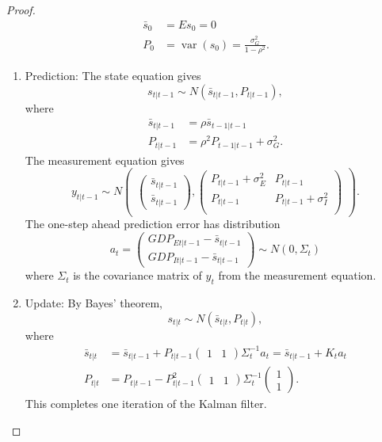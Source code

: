 \documentclass[oneside,reqno]{amsart}
\DeclareMathOperator{\var}{var}
\theoremstyle{definition}
\begin{document}
\begin{enumerate}[label=(\roman*)]
\begin{proof}
\begin{align*}
	\bar s_0 &= E s_0 = 0 \\
	P_0 &= \var(s_0) = \frac{\sigma^2_{G}}{1-\rho^2}.
\end{align*}
\begin{enumerate}[label=(\arabic*)]
\item
Prediction: The state equation gives
\[
	s_{t|t-1} \sim N(\bar s_{t|t-1}, P_{t|t-1}),
\]
where
\begin{align*}
	\bar s_{t|t-1} &= \rho \bar s_{t-1|t-1} \\
	P_{t|t-1} &= \rho^2 P_{t-1|t-1} + \sigma_{G}^2.
\end{align*}
The measurement equation gives
\[
	y_{t|t-1} \sim N \begin{pmatrix}
		\begin{pmatrix}
			\bar s_{t|t-1} \\
			\bar s_{t|t-1} 
		\end{pmatrix},
		\begin{pmatrix}
			P_{t|t-1} + \sigma_{E}^2 & P_{t|t-1} \\
			P_{t|t-1}  & P_{t|t-1} + \sigma_{I}^2 \\
		\end{pmatrix}
	\end{pmatrix}.
\]
The one-step ahead prediction error has distribution 
\[
	a_t = \begin{pmatrix}
		GDP_{Et|t-1} - \bar s_{t|t-1}\\
		GDP_{It|t-1} -\bar s_{t|t-1}
	\end{pmatrix} 
	\sim N(0, \Sigma_t)
\]
where $\Sigma_t$ is the covariance matrix of $y_t$ from the measurement equation. 
\item
Update: By Bayes' theorem,
\[
	s_{t|t} \sim N(\bar s_{t|t}, P_{t|t}),
\]
where 
\begin{align*}
	\bar s_{t|t} &= \bar s_{t|t-1} + P_{t|t-1} \begin{pmatrix} 1 & 1 \end{pmatrix} \Sigma_t^{-1} a_t 
		= \bar s_{t|t-1} + K_t a_t \\
	P_{t|t} &= P_{t|t-1} - P_{t|t-1}^2 \begin{pmatrix} 1 & 1 \end{pmatrix}  \Sigma_t^{-1} \begin{pmatrix} 1 \\ 1 \end{pmatrix}.
\end{align*}
This completes one iteration of the Kalman filter.
\end{enumerate}

\end{proof}
\end{enumerate}
\end{document}
